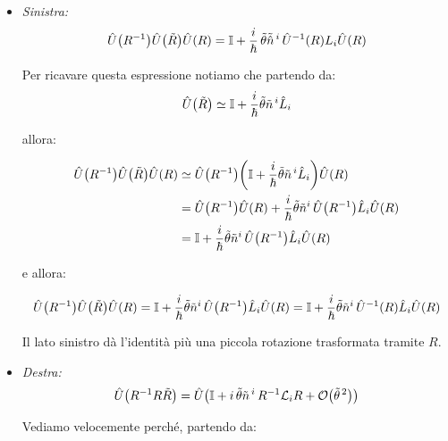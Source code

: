 \begin{itemize}
	\item \textit{Sinistra:}
	\begin{align*}
		\hat{U}\qty(R^{-1})\hat{U}\qty(\tilde{R}) \hat{U}\qty(R) = \mathbb{I} + \frac{i}{\hbar} \, \tilde{\theta}\tilde{\hat{n}}^{\, i} \,\hat{U}^{-1}\qty(R) L_i \hat{U}\qty(R)
	\end{align*}
	
	\begin{myprf}
		Per ricavare questa espressione notiamo che partendo da:
	\begin{align*}
		\hat{U}\qty(\tilde{R}) \simeq \mathbb{I} + \frac{i}{\hbar} \tilde{\theta}\tilde{n}^{\, i} \hat{L}_i
	\end{align*}
	
		allora:
		
	\begin{align*}
		\hat{U}\qty(R^{-1})\hat{U}\qty(\tilde{R})\hat{U}\qty(R) & \simeq \hat{U}\qty(R^{-1})\qty(\mathbb{I} + \frac{i}{\hbar} \tilde{\theta}\tilde{n}^{\, i} \hat{L}_i)\hat{U}\qty(R) \\
		& = \hat{U}\qty(R^{-1})\hat{U}\qty(R) + \frac{i}{\hbar} \tilde{\theta} \tilde{n}^i \, \hat{U}\qty(R^{-1})\hat{L}_i \hat{U}\qty(R) \\
		& = \mathbb{I} + \frac{i}{\hbar} \tilde{\theta} \tilde{n}^i \,\hat{U}\qty(R^{-1})\hat{L}_i \hat{U}\qty(R)
	\end{align*}
	
		e allora:
	
	\begin{align*}
		\hat{U}\qty(R^{-1})\hat{U}\qty(\tilde{R})\hat{U}\qty(R) = \mathbb{I} + \frac{i}{\hbar} \tilde{\theta} \tilde{n}^i \,\hat{U}\qty(R^{-1})\hat{L}_i \hat{U}\qty(R) = \mathbb{I} + \frac{i}{\hbar} \tilde{\theta} \tilde{n}^i \,\hat{U}^{-1}\qty(R)\hat{L}_i \hat{U}\qty(R) 
	\end{align*}
	
	\end{myprf}
		
		Il lato sinistro dà l'identità più una piccola rotazione trasformata tramite $R$.

 
	\item \textit{Destra:}
	\begin{align*}
		\hat{U}\qty(R^{-1}R\tilde{R}) = \hat{U}\qty(\mathbb{I} + i \, \tilde{\theta}\tilde{n}^{\, i} \, R^{-1} \mathcal{L}_i R + \order{\tilde{\theta}^{\, 2}})
	\end{align*}
		
	\begin{myprf}
		Vediamo velocemente perché, partendo da:
	

\end{myprf}
\end{itemize}
